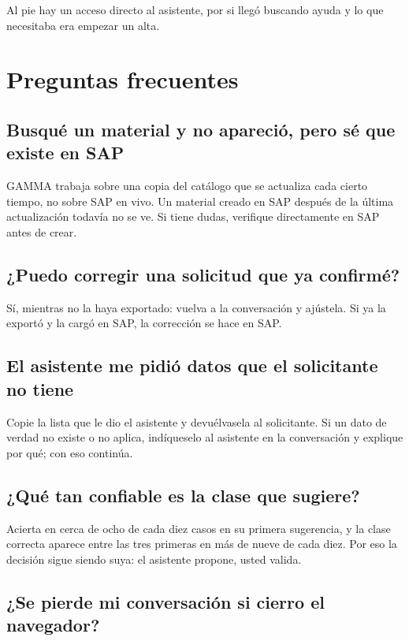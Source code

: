 Al pie hay un acceso directo al asistente, por si llegó buscando ayuda y lo que
necesitaba era empezar un alta.

\newpage
\section{Preguntas frecuentes}

\subsection*{Busqué un material y no apareció, pero sé que existe en SAP}

GAMMA trabaja sobre una copia del catálogo que se actualiza cada cierto tiempo,
no sobre SAP en vivo. Un material creado en SAP después de la última
actualización todavía no se ve. Si tiene dudas, verifique directamente en SAP
antes de crear.

\subsection*{¿Puedo corregir una solicitud que ya confirmé?}

Sí, mientras no la haya exportado: vuelva a la conversación y ajústela. Si ya la
exportó y la cargó en SAP, la corrección se hace en SAP.

\subsection*{El asistente me pidió datos que el solicitante no tiene}

Copie la lista que le dio el asistente y devuélvasela al solicitante. Si un dato
de verdad no existe o no aplica, indíqueselo al asistente en la conversación y
explique por qué; con eso continúa.

\subsection*{¿Qué tan confiable es la clase que sugiere?}

Acierta en cerca de ocho de cada diez casos en su primera sugerencia, y la clase
correcta aparece entre las tres primeras en más de nueve de cada diez. Por eso
la decisión sigue siendo suya: el asistente propone, usted valida.

\subsection*{¿Se pierde mi conversación si cierro el navegador?}

